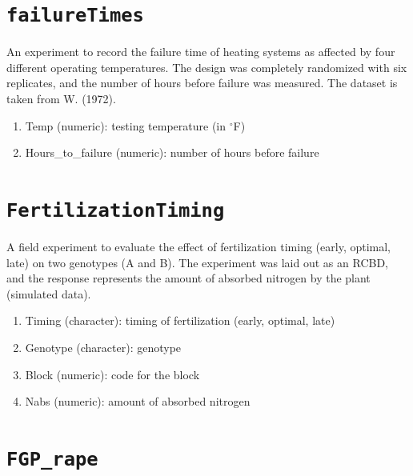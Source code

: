 \documentclass[
  letterpaper,
  DIV=11,
  numbers=noendperiod]{scrreprt}
\providecommand{\tightlist}{%
  \setlength{\itemsep}{0pt}\setlength{\parskip}{0pt}}
\begin{document}
\section*{\texorpdfstring{\texttt{failureTimes}}{failureTimes}}\label{failuretimes}


An experiment to record the failure time of heating systems as affected
by four different operating temperatures. The design was completely
randomized with six replicates, and the number of hours before failure
was measured. The dataset is taken from W. (1972).

\begin{enumerate}
\def\labelenumi{\arabic{enumi}.}
\tightlist
\item
  Temp (numeric): testing temperature (in \(^{\circ}\)F)
\item
  Hours\_to\_failure (numeric): number of hours before failure
\end{enumerate}

\section*{\texorpdfstring{\texttt{FertilizationTiming}}{FertilizationTiming}}\label{fertilizationtiming}


A field experiment to evaluate the effect of fertilization timing
(early, optimal, late) on two genotypes (A and B). The experiment was
laid out as an RCBD, and the response represents the amount of absorbed
nitrogen by the plant (simulated data).

\begin{enumerate}
\def\labelenumi{\arabic{enumi}.}
\tightlist
\item
  Timing (character): timing of fertilization (early, optimal, late)
\item
  Genotype (character): genotype
\item
  Block (numeric): code for the block
\item
  Nabs (numeric): amount of absorbed nitrogen
\end{enumerate}

\section*{\texorpdfstring{\texttt{FGP\_rape}}{FGP\_rape}}\label{fgp_rape}
\end{document}
